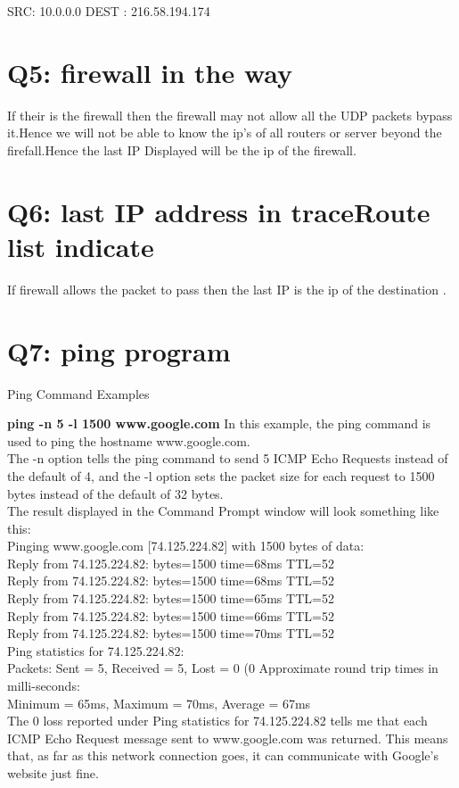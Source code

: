 \documentclass{article}
\begin{document}
SRC: 10.0.0.0
DEST : 216.58.194.174

 
\section{Q5: firewall in the way}
If their is the firewall then the firewall may not allow all the UDP packets bypass it.Hence we will not be able to know the ip's of all routers or server beyond the firefall.Hence the last IP Displayed will be the ip of the firewall.

\section{Q6: last IP address in traceRoute list indicate}
If firewall allows the packet to pass then the last IP is the ip of the destination .

\section{Q7: ping program}
Ping Command Examples

\textbf{ping -n 5 -l 1500 www.google.com}
In this example, the ping command is used to ping the hostname www.google.com.\\
The -n option tells the ping command to send 5 ICMP Echo Requests instead of the default of 4, and the -l option sets the packet size for each request to 1500 bytes instead of the default of 32 bytes.\\

The result displayed in the Command Prompt window will look something like this:\\

Pinging www.google.com [74.125.224.82] with 1500 bytes of data:\\
Reply from 74.125.224.82: bytes=1500 time=68ms TTL=52\\
Reply from 74.125.224.82: bytes=1500 time=68ms TTL=52\\
Reply from 74.125.224.82: bytes=1500 time=65ms TTL=52\\
Reply from 74.125.224.82: bytes=1500 time=66ms TTL=52\\
Reply from 74.125.224.82: bytes=1500 time=70ms TTL=52\\
Ping statistics for 74.125.224.82:\\
   Packets: Sent = 5, Received = 5, Lost = 0 (0%
Approximate round trip times in milli-seconds:\\
   Minimum = 65ms, Maximum = 70ms, Average = 67ms\\
The 0 loss reported under Ping statistics for 74.125.224.82 tells me that each ICMP Echo Request message sent to www.google.com was returned. This means that, as far as this network connection goes, it can communicate with Google's website just fine.\\
\end{document}
